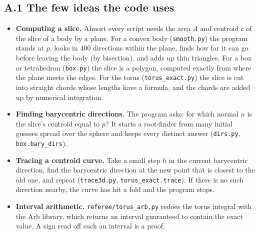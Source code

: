 \documentclass[11pt]{article}
\theoremstyle{plain}
\theoremstyle{definition}
\theoremstyle{remark}
\begin{document}
\subsection*{A.1 The few ideas the code uses}
\begin{itemize}
\item \textbf{Computing a slice.} Almost every script needs the area $A$ and centroid $c$ of the slice of a body by a plane. For a convex body (\texttt{smooth.py}) the program stands at $p$, looks in 400 directions within the plane, finds how far it can go before leaving the body (by bisection), and adds up thin triangles. For a box or tetrahedron (\texttt{box.py}) the slice is a polygon, computed exactly from where the plane meets the edges. For the torus (\texttt{torus\_exact.py}) the slice is cut into straight chords whose lengths have a formula, and the chords are added up by numerical integration.
\item \textbf{Finding barycentric directions.} The program asks: for which normal $n$ is the slice's centroid equal to $p$? It starts a root-finder from many initial guesses spread over the sphere and keeps every distinct answer (\texttt{dirs.py}, \texttt{box.bary\_dirs}).
\item \textbf{Tracing a centroid curve.} Take a small step $h$ in the current barycentric direction, find the barycentric direction at the new point that is closest to the old one, and repeat (\texttt{trace3d.py}, \texttt{torus\_exact.trace}). If there is no such direction nearby, the curve has hit a fold and the program stops.
\item \textbf{Interval arithmetic.} \texttt{referee/torus\_arb.py} redoes the torus integral with the Arb library, which returns an interval guaranteed to contain the exact value. A sign read off such an interval is a proof.
\end{itemize}
\end{document}
